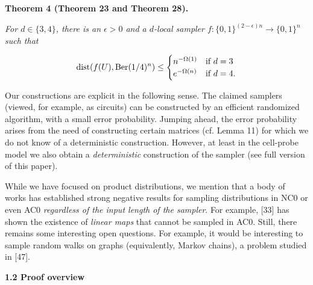 



\par\medskip\noindent\textbf{
\textbf{Theorem 4}\textbf{ }(Theorem 23 and Theorem 28)\textbf{.}
}\par



\emph{For $d\in\{3,4\}$, there is an $\epsilon>0$ and a $d$-local sampler $f\colon\{0,1\}^{(2-\epsilon)n}\to\{0,1\}^{n}$ such that}\par


\[\begin{gathered}
\mathrm{dist}(f(U),\textnormal{Ber}(1/4)^{n})\leq\begin{cases}n^{-\Omega(1)}&\text{if $d=3$}\\
e^{-\Omega(n)}&\text{if $d=4$.}\end{cases}
\end{gathered}\]






Our constructions are explicit in the following sense. The claimed samplers (viewed, for example, as circuits) can be constructed by an efficient randomized algorithm, with a small error probability.
Jumping ahead, the error probability arises from the need of constructing
certain matrices (cf. Lemma 11) for which we do not know of a deterministic construction. However, at least in the cell-probe model we also obtain a \emph{deterministic} construction of the sampler (see full version of this paper).\par




While we have focused on product distributions, we mention that a body of works has established strong negative results for sampling distributions in NC0 or even AC0 \emph{regardless of the input length of the sampler}. For example, [33] has shown the existence of \emph{linear maps} that cannot be sampled in AC0. Still, there remains some interesting open questions. For example, it would be interesting to sample random walks on graphs (equivalently, Markov chains), a problem studied in [47].\par





\par\medskip\noindent\textbf{
1.2 Proof overview}\par




